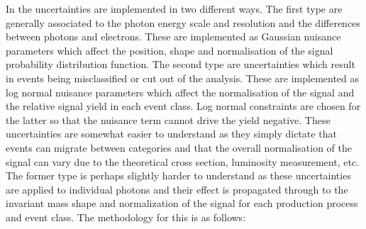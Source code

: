 In the \MFM uncertainties are implemented in two different ways. The first type are generally associated to the photon energy scale and resolution and the differences between photons and electrons. These are implemented as Gaussian nuisance parameters which affect the position, shape and normalisation of the signal probability distribution function. The second type are uncertainties which result in events being misclassified or cut out of the analysis. These are implemented as log normal nuisance parameters which affect the normalisation of the signal and the relative signal yield in each event class. Log normal constraints are chosen for the latter so that the nuisance term cannot drive the yield negative. These uncertainties are somewhat easier to understand as they simply dictate that events can migrate between categories and that the overall normalisation of the signal can vary due to the theoretical cross section, luminosity measurement, etc. The former type is perhaps slightly harder to understand as these uncertainties are applied to individual photons and their effect is propagated through to the invariant mass shape and normalization of the signal for each production process and event class. The methodology for this is as follows:

